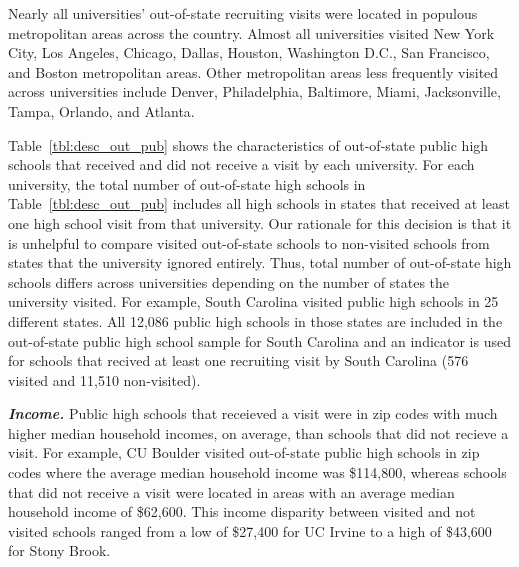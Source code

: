 \documentclass[twoside]{article}
\begin{document}
Nearly all universities' out-of-state recruiting visits were located in populous metropolitan areas across the country. Almost all universities visited New York City, Los Angeles, Chicago, Dallas, Houston, Washington D.C., San Francisco, and Boston metropolitan areas. Other metropolitan areas less frequently visited across universities include Denver, Philadelphia, Baltimore, Miami, Jacksonville, Tampa, Orlando, and Atlanta.

Table~\ref{tbl:desc_out_pub} shows the characteristics of out-of-state public high schools that received and did not receive a visit by each university. For each university, the total number of out-of-state high schools in Table~\ref{tbl:desc_out_pub} includes all high schools in states that received at least one high school visit from that university.  Our rationale for this decision is that it is unhelpful to compare visited out-of-state schools to non-visited schools from states that the university ignored entirely. Thus, total number of out-of-state high schools differs across universities depending on the number of states the university visited.  For example, South Carolina visited public high schools in 25 different states. All 12,086 public high schools in those states are included in the out-of-state public high school sample for South Carolina and an indicator is used for schools that recived at least one recruiting visit by South Carolina (576 visited and 11,510 non-visited).




\textbf{\textit{Income.}} Public high schools that receieved a visit were in zip codes with much higher median household incomes, on average, than schools that did not recieve a visit. For example, CU Boulder visited out-of-state public high schools in zip codes where the average median household income was \$114,800, whereas schools that did not receive a visit were located in areas with an average median household income of \$62,600. This income disparity between visited and not visited schools ranged from a low of \$27,400 for UC Irvine to a high of \$43,600 for Stony Brook. %
\end{document}
